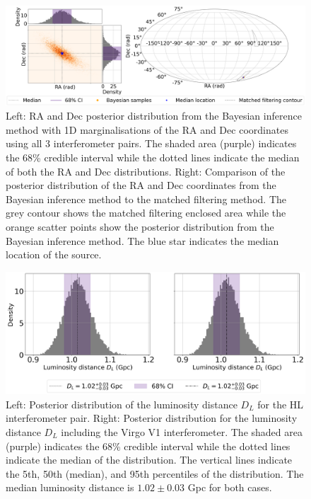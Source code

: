 \documentclass[11pt,a4paper]{article}
\begin{document}
\begin{landscape}
\begin{figure}
    \includegraphics[width=\columnwidth, keepaspectratio]{../figures/radec_posterior_HLV.png}
    \caption{Left: RA and Dec posterior distribution from the Bayesian inference method with 1D marginalisations of the RA and Dec coordinates using all 3 interferometer pairs. The shaded area (purple) indicates the 68\% credible interval while the dotted lines indicate the median of both the RA and Dec distributions. Right: Comparison of the posterior distribution of the RA and Dec coordinates from the Bayesian inference method to the matched filtering method. The grey contour shows the matched filtering enclosed area while the orange scatter points show the posterior distribution from the Bayesian inference method. The blue star indicates the median location of the source.}
    \label{fig:hlv_compare}
\end{figure}
\end{landscape}

\begin{figure}
    \includegraphics[width=\columnwidth, keepaspectratio]{../figures/dl_posterior.png}
    \caption{Left: Posterior distribution of the luminosity distance $D_L$ for the HL interferometer pair. Right: Posterior distribution for the luminosity distance $D_L$ including the Virgo V1 interferometer. The shaded area (purple) indicates the 68\% credible interval while the dotted lines indicate the median of the distribution. The vertical lines indicate the 5th, 50th (median), and 95th percentiles of the distribution. The median luminosity distance is $1.02 \pm 0.03$ Gpc for both cases.}
    \label{fig:luminosity_distance}
\end{figure}
\end{document}
